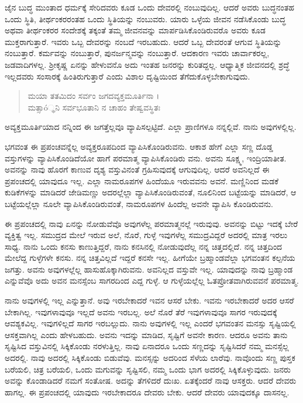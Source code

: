ಜೈನ ಬುದ್ಧ ಮುಂತಾದ ಧರ್ಮಕ್ಕೆ ಸೇರಿದವರು ಕೂಡ ಒಂದು ದೇವರಲ್ಲಿ ನಂಬುವುದಿಲ್ಲ. ಆದರೆ ಅವರು ಬುದ್ಧನಂತಹ ಒಂದು ಸ್ಥಿತಿ, ತೀರ್ಥಂಕರರಂತಹ ಒಂದು ಸ್ಥಿತಿಯನ್ನು ನಂಬುವರು. ಯಾರು ಒಳ್ಳೆಯ ಜೀವನ ನಡೆಸಿಕೊಂಡು ಬುದ್ಧ ಅಥವಾ ತೀರ್ಥಂಕರರ ಸಂದೇಶಕ್ಕೆ ತಕ್ಕಂತೆ ತಮ್ಮ ಜೀವನವನ್ನು ಮಾರ್ಪಡಿಸಿಕೊಂಡಿರುವರೊ ಅವರು ಕೂಡ ಮುಕ್ತರಾಗುತ್ತಾರೆ. ಇವರು ಒಬ್ಬ ದೇವರನ್ನು ನಂಬದೆ ಇರಬಹುದು. ಆದರೆ ಒಬ್ಬ ದೇವರಂತೆ ಆಗುವ ಸ್ಥಿತಿಯನ್ನು ನಂಬುತ್ತಾರೆ. ಕರ್ಮವನ್ನು ನಂಬುತ್ತಾರೆ, ಪುನರ್ಜನ್ಮವನ್ನು ನಂಬುತ್ತಾರೆ. ಆದಕಾರಣ ಇವರು ಚಾರ್ವಾಕರಲ್ಲ, ಜಡವಾದಿಗಳಲ್ಲ. ಶ್ರೀಕೃಷ್ಣ ಏನನ್ನು ಹೇಳುವನೊ ಅದು ಇಂತಹ ಜನರನ್ನು ಕುರಿತದ್ದಲ್ಲ. ಆಧ್ಯಾತ್ಮಿಕ ಜೀವನದಲ್ಲಿ ಶ್ರದ್ಧೆ ಇಲ್ಲದವರು ಸಂಸಾರಕ್ಕೆ ಹಿಂತಿರುಗುತ್ತಾರೆ ಎಂದು ವಿಶಾಲ ದೃಷ್ಟಿಯಿಂದ ತೆಗೆದುಕೊಳ್ಳಬೇಕಾಗುವುದು.

\begin{verse}
ಮಯಾ ತತಮಿದಂ ಸರ್ವಂ ಜಗದವ್ಯಕ್ತಮೂರ್ತಿನಾ ।\\ಮತ್ಸಾó್ಥನಿ ಸರ್ವಭೂತಾನಿ ನ ಚಾಹಂ ತೇಷ್ವವಸ್ಥಿತಃ 
\end{verse}

{\small ಅವ್ಯಕ್ತಮೂರ್ತಿಯಾದ ನನ್ನಿಂದ ಈ ಜಗತ್ತೆಲ್ಲವೂ ವ್ಯಾಪಿಸಲ್ಪಟ್ಟಿದೆ. ಎಲ್ಲಾ ಪ್ರಾಣಿಗಳೂ ನನ್ನಲ್ಲಿವೆ. ನಾನು ಅವುಗಳಲ್ಲಿಲ್ಲ.}

ಭಗವಂತ ಈ ಪ್ರಪಂಚವನ್ನೆಲ್ಲ ಅವ್ಯಕ್ತರೂಪದಿಂದ ವ್ಯಾಪಿಸಿಕೊಂಡಿರುವನು. ಆಕಾಶ ಹೇಗೆ ಎಲ್ಲಾ ಸಣ್ಣ ದೊಡ್ಡ ವಸ್ತುಗಳನ್ನು ವ್ಯಾಪಿಸಿಕೊಂಡಿದೆಯೋ ಹಾಗೆ ಪರಮಾತ್ಮ ವ್ಯಾಪಿಸಿಕೊಂಡಿರು ವನು. ಅವನು ಸೂಕ್ಷ್ಮ, ಇಂದ್ರಿಯಾತೀತ. ಅವನನ್ನು ನಾವು ಹೊರಗೆ ಕಾಣುವ ದೃಶ್ಯ ವಸ್ತುವಿನಂತೆ ಗ್ರಹಿಸುವುದಕ್ಕೆ ಆಗುವುದಿಲ್ಲ. ಆದರೆ ಅವನಿಲ್ಲದೆ ಈ ಪ್ರಪಂಚದಲ್ಲಿ ಯಾವುದೂ ಇಲ್ಲ. ಎಲ್ಲಾ ನಾಮರೂಪಗಳ ಹಿಂದೆಯೂ ಇರುವವನು ಅವನೆ. ಮಣ್ಣಿನಿಂದ ಮಡಕೆ ಕುಡಿಕೆಗಳನ್ನು ಮಾಡಿದರೆ ಜೇಡಿಮಣ್ಣು ಅದರಲ್ಲೆಲ್ಲಾ ವ್ಯಾಪಿಸಿಕೊಂಡಿರುವಂತೆ, ನೂಲಿನಿಂದ ಬಟ್ಟೆಯನ್ನು ಮಾಡಿದರೆ, ಆ ಬಟ್ಟೆಯಲ್ಲೆಲ್ಲಾ ನೂಲೇ ವ್ಯಾಪಿಸಿಕೊಂಡಿರುವಂತೆ, ನಾಮರೂಪಗಳ ಹಿಂದೆಲ್ಲ ಅವನೇ ವ್ಯಾಪಿಸಿ ಕೊಂಡಿರುವನು.

ಈ ಪ್ರಪಂಚದಲ್ಲಿ ನಾವು ಏನನ್ನು ನೋಡುವೆವೊ ಅವುಗಳೆಲ್ಲ ಪರಮಾತ್ಮನಲ್ಲೆ ಇರುವುವು. ಅವನನ್ನು ಬಿಟ್ಟು ಇದಕ್ಕೆ ಬೇರೆ ವ್ಯಕ್ತಿತ್ವ ಇಲ್ಲ. ಸಮುದ್ರದ ಮೇಲೆ ಇರುವ ಅಲೆ, ನೊರೆ, ಗುಳ್ಳೆ ಇವುಗಳೆಲ್ಲ ಸಮುದ್ರವಿದ್ದರೆ ಅದರಲ್ಲಿ ಮಾತ್ರ ಇರಲು ಸಾಧ್ಯ. ನಾನು ಒಂದು ಕನಸು ಕಾಣುತ್ತಿದ್ದರೆ, ನಾನು ಕನಸಿನಲ್ಲಿ ನೋಡುವುದೆಲ್ಲ ನನ್ನ ಚಿತ್ತದಲ್ಲಿದೆ. ನನ್ನ ಚಿತ್ತದಿಂದ ಮೇಲೆದ್ದ ಗುಳ್ಳೆಗಳೇ ಕನಸು. ನನ್ನ ಚಿತ್ತವಿಲ್ಲದೆ ಇದ್ದರೆ ಕನಸೇ ಇಲ್ಲ. ಹೀಗೆಯೇ ಬ್ರಹ್ಮಾಂಡವೆಲ್ಲಾ ಭಗವಂತನ ಕಲ್ಪನೆಯ ಜಗತ್ತು. ಅವನು ಅವುಗಳಲ್ಲೆಲ್ಲ ಹಾಸುಹೊಕ್ಕಾಗಿರುವನು. ಅವನಿಲ್ಲದ ವಸ್ತುವೇ ಇಲ್ಲ. ಯಾವುದನ್ನು ನಾವು ಬ್ರಹ್ಮಾಂಡ ಎನ್ನುವೆವೊ ಅದು ಅವನ ಮನಸ್ಸೆಂಬ ಸಾಗರದಿಂದ ಎದ್ದ ಗುಳ್ಳೆ. ಆ ಗುಳ್ಳೆಯಲ್ಲೆಲ್ಲ ಓತಪ್ರೋತವಾಗಿರುವವನೆ ಪರಮಾತ್ಮ.

ನಾನು ಅವುಗಳಲ್ಲಿ ಇಲ್ಲ ಎನ್ನುತ್ತಾನೆ. ಅವು ಇರಬೇಕಾದರೆ ಇವನ ಆಸರೆ ಬೇಕು. ಇವನು ಇರಬೇಕಾದರೆ ಅದರ ಆಸರೆ ಬೇಕಾಗಿಲ್ಲ. ಇವುಗಳಾವುವೂ ಇಲ್ಲದೆ ಅವನು ಇರಬಲ್ಲ. ಅಲೆ ನೊರೆ ತೆರೆ ಇವುಗಳಾವುವೂ ಸಾಗರ ಇರುವುದಕ್ಕೆ ಆವಶ್ಯಕವಿಲ್ಲ. ಇವುಗಳಿಲ್ಲದೆ ಸಾಗರ ಇರಬಲ್ಲುದು. ನಾನು ಅವುಗಳಲ್ಲಿ ಇಲ್ಲ ಎಂದರೆ ಭಗವಂತನ ಮನಸ್ಸು ಸೃಷ್ಟಿಯಲ್ಲಿ ಆಸಕ್ತವಾಗಿಲ್ಲ ಎಂದು ಹೇಳಬಹುದು. ಅವನು ಇದನ್ನು ಮಾಡಿದ, ಸೃಷ್ಟಿಗೆ ಅವನೇ ಕಾರಣ. ಆದರೂ ಅವನು ತಾನು ಸೃಷ್ಟಿಸಿದ ವಸ್ತುವಿನಲ್ಲಿ ಸಿಕ್ಕಿಕೊಂಡು ನರಳುತ್ತಿಲ್ಲ. ನಾವು ಏನಾದರೂ ಒಂದು ಸಣ್ಣದನ್ನು ಸೃಷ್ಟಿಸಿದರೆ ನಮ್ಮ ಮನಸ್ಸೆಲ್ಲ ಅದರಲ್ಲಿ. ನಾವು ಅದರಲ್ಲಿ ಸಿಕ್ಕಿಕೊಂಡು ಬಿಡುವೆವು. ಮನಸ್ಸನ್ನು ಅದರಿಂದ ಸೆಳೆಯ ಲಾರೆವು. ನಾವೊಂದು ಸಣ್ಣ ಪುಸ್ತಕ ಬರೆಯಲಿ, ಚಿತ್ರ ಬರೆಯಲಿ, ಒಂದು ಮಗುವನ್ನು ಸೃಷ್ಟಿಸಲಿ, ನಮ್ಮ ಒಂದು ಭಾಗ ಅದರಲ್ಲಿ ಸಿಕ್ಕಿಕೊಳ್ಳುವುದು. ಜನರು ಅವನ್ನು ಕೊಂಡಾಡಿದರೆ ನಮಗೆ ಸಂತೋಷ. ಅದನ್ನು ತೆಗಳಿದರೆ ದುಃಖ. ಏತಕ್ಕೆಂದರೆ ನಾವು ಆಸಕ್ತರು. ಆದರೆ ದೇವರು ಹಾಗಲ್ಲ. ಈ ಪ್ರಪಂಚದಲ್ಲಿ ಯಾವುದು ಇರಬೇಕಾದರೂ ದೇವರು ಬೇಕು. ಆದರೆ ದೇವರು ಯಾವುದಕ್ಕೂ ದಾಸನಲ್ಲ.

